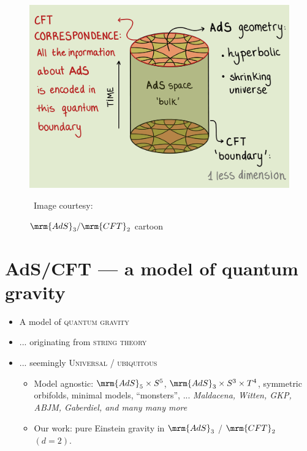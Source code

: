 \documentclass[10pt]{article}
\begin{document}
\citeMaldacena
\stateAdsCft
\begin{figure}[!h]
	\centering
	\includegraphics[width=.5\linewidth]{img/ads-cft.png}

	\vspace{-.2\baselineskip}
	\caption{$\mrm{AdS}_3/\mrm{CFT}_2$ cartoon}
	
	\scriptsize\ Image courtesy: \textcite{AldegundePWSep22}
\end{figure}
\vspace{-1.3\baselineskip}


\section*{AdS/CFT --- a model of quantum gravity}
\citeMaldacena
\stateAdsCft
\begin{itemize}

\item A model of \textsc{quantum gravity}
\item ... originating from \textsc{string theory}
\item ... seemingly \textsc{Universal / ubiquitous}

\begin{itemize}
	\item Model agnostic: $\mrm{AdS}_5\times S^5$, $\mrm{AdS}_3\times S^3 \times T^4$, symmetric orbifolds, minimal models, ``monsters'', ... \textit{\small Maldacena, Witten, GKP, ABJM, Gaberdiel, and many many more}
	\item Our work: pure Einstein gravity in $\mrm{AdS}_3$ / $\mrm{CFT}_2$ $(d=2)$.
	
\end{itemize}
\end{itemize}
\end{document}
